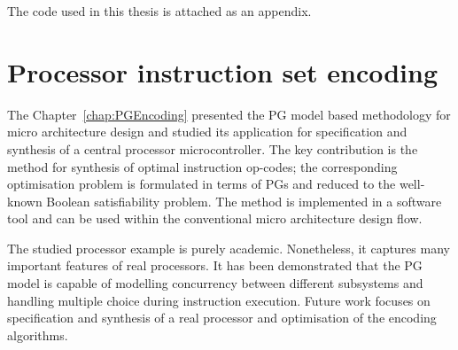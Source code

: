 The code used in this thesis is attached as an appendix.

\section{Processor instruction set encoding}

The Chapter~\ref{chap:PGEncoding} presented the PG model based methodology for micro architecture
design and studied its application for specification and synthesis
of a central processor microcontroller. The key contribution is
the method for synthesis of optimal instruction op-codes; the corresponding
optimisation problem is formulated in terms of PGs and reduced to
the well-known Boolean satisfiability problem. The method is implemented
in a software tool and can be used within the conventional micro architecture
design flow.

The studied processor example is purely academic. Nonetheless, it captures
many important features of real processors. It has been demonstrated
that the PG model is capable of modelling concurrency between different
subsystems and handling multiple choice during instruction execution.
Future work focuses on specification and synthesis of a real processor
and optimisation of the encoding algorithms.
